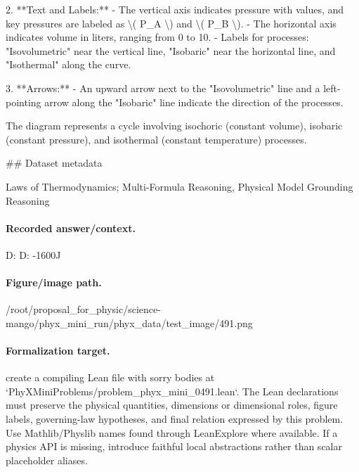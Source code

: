 2. **Text and Labels:**
   - The vertical axis indicates pressure with values, and key pressures are labeled as \textbackslash{}( P\_A \textbackslash{}) and \textbackslash{}( P\_B \textbackslash{}).
   - The horizontal axis indicates volume in liters, ranging from 0 to 10.
   - Labels for processes: "Isovolumetric" near the vertical line, "Isobaric" near the horizontal line, and "Isothermal" along the curve.

3. **Arrows:**
   - An upward arrow next to the "Isovolumetric" line and a left-pointing arrow along the "Isobaric" line indicate the direction of the processes.

The diagram represents a cycle involving isochoric (constant volume), isobaric (constant pressure), and isothermal (constant temperature) processes.

\#\# Dataset metadata

Laws of Thermodynamics; Multi-Formula Reasoning, Physical Model Grounding Reasoning

\paragraph{Recorded answer/context.}
D: D: -1600J

\paragraph{Figure/image path.}
/root/proposal\_for\_physic/science-mango/phyx\_mini\_run/phyx\_data/test\_image/491.png

\paragraph{Formalization target.}
create a compiling Lean file with sorry bodies at `PhyXMiniProblems/problem\_phyx\_mini\_0491.lean`. The Lean declarations must preserve the physical quantities, dimensions or dimensional roles, figure labels, governing-law hypotheses, and final relation expressed by this problem.
Use Mathlib/Physlib names found through LeanExplore where available. If a physics API is missing, introduce faithful local abstractions rather than scalar placeholder aliases.

